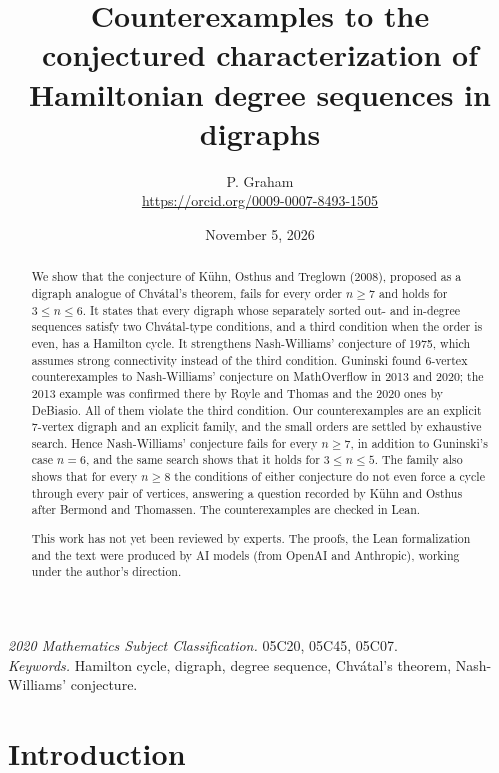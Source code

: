 \documentclass[11pt]{article}
\title{Counterexamples to the conjectured characterization of Hamiltonian degree sequences in digraphs}
\author{P. Graham\\ \small\url{https://orcid.org/0009-0007-8493-1505}}
\date{November 5, 2026}
\begin{document}
\maketitle
\begin{abstract}
We show that the conjecture of Kühn, Osthus and Treglown (2008), proposed as a digraph analogue of Chvátal's theorem, fails for every order $n\ge7$ and holds for $3\le n\le6$. It states that every digraph whose separately sorted out- and in-degree sequences satisfy two Chvátal-type conditions, and a third condition when the order is even, has a Hamilton cycle. It strengthens Nash-Williams' conjecture of 1975, which assumes strong connectivity instead of the third condition. Guninski found 6-vertex counterexamples to Nash-Williams' conjecture on MathOverflow in 2013 and 2020; the 2013 example was confirmed there by Royle and Thomas and the 2020 ones by DeBiasio. All of them violate the third condition. Our counterexamples are an explicit 7-vertex digraph and an explicit family, and the small orders are settled by exhaustive search. Hence Nash-Williams' conjecture fails for every $n\ge7$, in addition to Guninski's case $n=6$, and the same search shows that it holds for $3\le n\le5$. The family also shows that for every $n\ge8$ the conditions of either conjecture do not even force a cycle through every pair of vertices, answering a question recorded by Kühn and Osthus after Bermond and Thomassen. The counterexamples are checked in Lean.

This work has not yet been reviewed by experts. The proofs, the Lean formalization and the text were produced by AI models (from OpenAI and Anthropic), working under the author's direction.
\end{abstract}
\medskip
\noindent\textit{2020 Mathematics Subject Classification.} 05C20, 05C45, 05C07.\\
\textit{Keywords.} Hamilton cycle, digraph, degree sequence, Chvátal's theorem, Nash-Williams' conjecture.

\section{Introduction}
\end{document}
